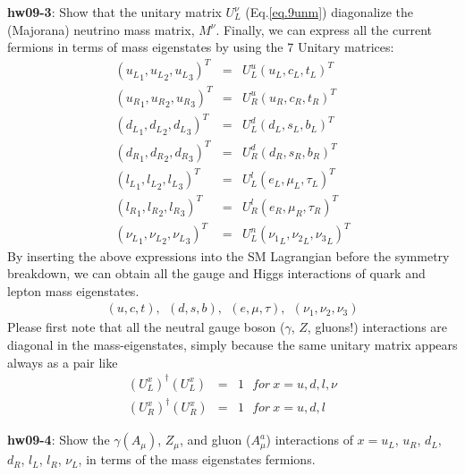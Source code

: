 \documentclass[12pt]{article}
\begin{document}
{\bf hw09-3}: Show that the unitary matrix $U^\nu_L$ (Eq.\ref{eq.9unm}) diagonalize the (Majorana) neutrino mass matrix, $M^\nu$.
  Finally, we can express all the current fermions in terms of
  mass eigenstates by using the 7 Unitary matrices:
\begin{eqnarray}
  ({u_L}_1, {u_L}_2, {u_L}_3)^T &=& U^u_L (u_L, c_L, t_L)^T \label{eq.9unim1}\\
  ({u_R}_1, {u_R}_2, {u_R}_3)^T &=& U^u_R (u_R, c_R, t_R)^T \label{eq.9unim2}\\
  ({d_L}_1, {d_L}_2, {d_L}_3)^T &=& U^d_L (d_L, s_L, b_L)^T \label{eq.9unim3}\\
  ({d_R}_1, {d_R}_2, {d_R}_3)^T &=& U^d_R (d_R, s_R, b_R)^T  \label{eq.9unim4}\\
  ({l_L}_1, {l_L}_2, {l_L}_3)^T &=& U^l_L (e_L, \mu_L, \tau_L)^T \label{eq.9unim5}\\
  ({l_R}_1, {l_R}_2, {l_R}_3)^T &=& U^l_R (e_R, \mu_R, \tau_R)^T \label{eq.9unim6}\\
  ({\nu_L}_1, {\nu_L}_2, {\nu_L}_3)^T &=& U^n_L ({\nu_1}_L, {\nu_2}_L, {\nu_3}_L)^T \label{eq.9unim7}
\end{eqnarray}
  By inserting the above expressions into the SM Lagrangian before the
  symmetry breakdown, we can obtain all the gauge and Higgs interactions of quark and lepton mass eigenstates.
\begin{eqnarray}
  (u, c, t),~~ (d, s, b), ~~ (e, \mu, \tau),~~ (\nu_1, \nu_2, \nu_3)
\end{eqnarray}
  Please first note that all the neutral gauge boson ($\gamma$, $Z$, 
gluons!) interactions are diagonal in the mass-eigenstates, simply because 
the same unitary matrix appears always as a pair like
\begin{eqnarray}
  (U^x_L)^\dagger (U^x_L) &=& 1   ~~~for~ x=u,d,l,\nu \\
  (U^x_R)^\dagger (U^x_R) &=& 1   ~~~for~ x=u,d,l
\end{eqnarray}

{\bf hw09-4}: Show the $\gamma (A_\mu)$, $Z_\mu$, and gluon ($A^a_\mu$) 
interactions of $x=u_L$, $u_R$, $d_L$, $d_R$, $l_L$, $l_R$, $\nu_L$, in terms of the mass eigenstates fermions.
\end{document}
